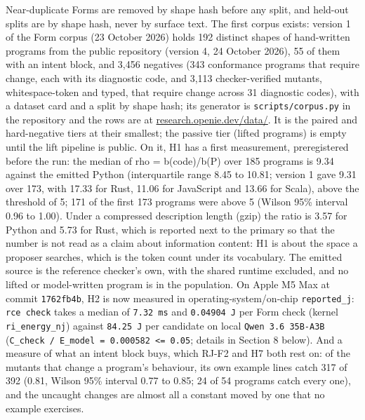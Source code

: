 \documentclass[10pt,letterpaper]{article}
\begin{document}
Near-duplicate Forms are removed by shape hash before any split, and
held-out splits are by shape hash, never by surface text. The first
corpus exists: version 1 of the Form corpus (23 October 2026) holds 192
distinct shapes of hand-written programs from the public repository
(version 4, 24 October 2026), 55 of them with an intent block, and 3,456
negatives (343 conformance programs that require change, each with its
diagnostic code, and 3,113 checker-verified mutants, whitespace-token
and typed, that require change across 31 diagnostic codes), with a
dataset card and a split by shape hash; its generator is
\texttt{scripts/\allowbreak{}corpus.\allowbreak{}py} in the repository and the rows are at
\href{https://research.openie.dev/data/\#rce-jepa}{research.openie.dev/data/}.
It is the paired and hard-negative tiers at their smallest; the passive
tier (lifted programs) is empty until the lift pipeline is public. On
it, H1 has a first measurement, preregistered before the run: the median
of rho = b(code)/b(P) over 185 programs is 9.34 against the emitted
Python (interquartile range 8.45 to 10.81; version 1 gave 9.31 over 173,
with 17.33 for Rust, 11.06 for JavaScript and 13.66 for Scala), above
the threshold of 5; 171 of the first 173 programs were above 5 (Wilson
95\% interval 0.96 to 1.00). Under a compressed description length
(gzip) the ratio is 3.57 for Python and 5.73 for Rust, which is reported
next to the primary so that the number is not read as a claim about
information content: H1 is about the space a proposer searches, which is
the token count under its vocabulary. The emitted source is the
reference checker's own, with the shared runtime excluded, and no lifted
or model-written program is in the population. On Apple M5 Max at commit
\texttt{1762fb4b}, H2 is now measured in operating-system/on-chip
\texttt{reported\_\allowbreak{}j}: \texttt{rce\ check} takes a median of
\texttt{7.32\ ms} and \texttt{0.\allowbreak{}04904\ J} per Form check (kernel
\texttt{ri\_\allowbreak{}energy\_\allowbreak{}nj}) against \texttt{84.25\ J} per candidate on
local \texttt{Qwen\ 3.\allowbreak{}6\ 35B-\allowbreak{}A3B}
(\texttt{C\_check\ /\ E\_model\ =\ 0.000582\ \textless{}=\ 0.05};
details in Section 8 below). And a measure of what an intent block buys,
which RJ-F2 and H7 both rest on: of the mutants that change a program's
behaviour, its own example lines catch 317 of 392 (0.81, Wilson 95\%
interval 0.77 to 0.85; 24 of 54 programs catch every one), and the
uncaught changes are almost all a constant moved by one that no example
exercises.
\end{document}
